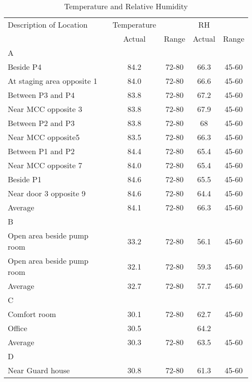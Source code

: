 \begin{table}
	\caption{Temperature and Relative Humidity}
	\label{ch047_tbl_tdb_rh}
	{\footnotesize

\begin{tabular}{l|c|c|c|c}

\hline
Description of Location & \multicolumn{1}{c}{Temperature} &  & \multicolumn{1}{c}{RH} &  \\ 
\cline{2-5}
 & Actual & Range & Actual & Range \\ 
\hline
A &  &  &  &  \\ 
Beside P4 & 84.2 & 72-80 & 66.3 & 45-60 \\ 
At staging area opposite 1 & 84.0 & 72-80 & 66.6 & 45-60 \\ 
Between P3 and P4 & 83.8 & 72-80 & 67.2 & 45-60 \\ 
Near MCC opposite 3 & 83.8 & 72-80 & 67.9 & 45-60 \\ 
Between P2 and P3 & 83.8 & 72-80 & 68 & 45-60 \\ 
Near MCC opposite5 & 83.5 & 72-80 & 66.3 & 45-60 \\ 
Between P1 and P2 & 84.4 & 72-80 & 65.4 & 45-60 \\ 
Near MCC opposite 7 & 84.0 & 72-80 & 65.4 & 45-60 \\ 
Beside P1 & 84.6 & 72-80 & 65.5 & 45-60 \\ 
Near door 3 opposite 9 & 84.6 & 72-80 & 64.4 & 45-60 \\ 
Average & 84.1 & 72-80 & 66.3 & 45-60 \\ 
\hline
B &  &  &  &  \\ 
Open area beside pump room & 33.2 & 72-80 & 56.1 & 45-60 \\ 
Open area beside pump room & 32.1 & 72-80 & 59.3 & 45-60 \\ 
Average & 32.7 & 72-80 & 57.7 & 45-60 \\ 
\hline
C &  &  &  &  \\ 
Comfort room & 30.1 & 72-80 & 62.7 & 45-60 \\ 
Office & 30.5 &  & 64.2 &  \\ 
Average & 30.3 & 72-80 & 63.5 & 45-60 \\ 
\hline
D &  &  &  &  \\ 
Near Guard house & 30.8 & 72-80 & 61.3 & 45-60 \\ 
\hline

\end{tabular}
}
\end{table}